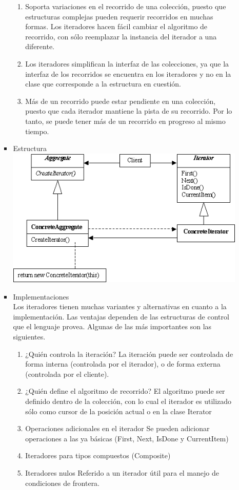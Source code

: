 \documentclass{article}
\begin{document}
\begin{enumerate}
\begin{itemize}
\begin{itemize}
\begin{enumerate}
\item	Soporta  variaciones en el recorrido de una colección, puesto que estructuras complejas pueden requerir recorridos en muchas formas. Los iteradores hacen fácil cambiar el algoritmo de recorrido, con sólo reemplazar la instancia del iterador a una diferente.
\item	Los iteradores simplifican la interfaz de las colecciones, ya que la interfaz de los recorridos se encuentra en los iteradores y no en la clase que corresponde a la estructura en cuestión.
\item	Más de un recorrido puede estar pendiente en una colección, puesto que cada iterador mantiene la pista de su recorrido. Por lo tanto, se puede tener más de un recorrido en progreso al mismo tiempo.
\end{enumerate} 

\item{Estructura}\\
\includegraphics[width=12cm]{iterator.png}


\item{Implementaciones}\\

Los iteradores tienen muchas variantes y alternativas en cuanto a la implementación. Las ventajas dependen de las estructuras de control que el lenguaje provea. Algunas de las más importantes son las siguientes.
\begin{enumerate}
\item	¿Quién controla la iteración?
La iteración puede ser controlada de forma interna (controlada por el iterador), o de forma externa (controlada por el cliente).
\item	¿Quién define el algoritmo de recorrido?
El algoritmo puede ser definido dentro de la colección, con lo cual el iterador es utilizado sólo como cursor de la posición actual o en la clase Iterator
\item	Operaciones adicionales en el iterador
Se pueden adicionar operaciones a las ya básicas (First, Next, IsDone y CurrentItem)
\item	Iteradores para tipos compuestos (Composite)
\item	Iteradores nulos
Referido a un iterador útil para el manejo de condiciones de frontera.
\end{enumerate}
\end{itemize}




\end{itemize}
\end{enumerate}
\end{document}
